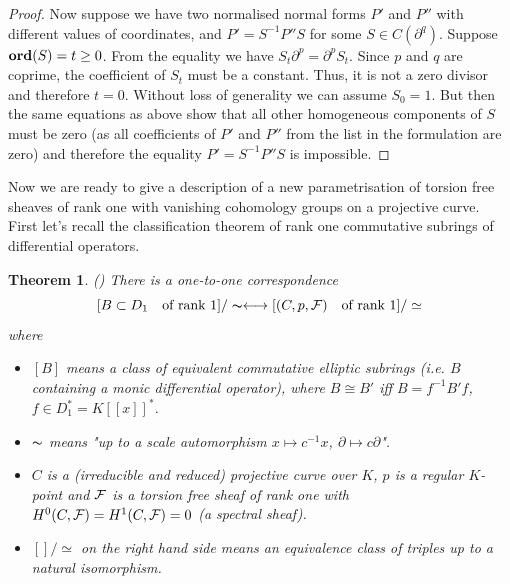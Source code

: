 \documentclass[11pt]{article}
\theoremstyle{definition}
\newcommand{\Ord}{\mathop {\rm \bf ord}}
\theoremstyle{plain}
\newtheorem{theorem}{Theorem}[section]
\numberwithin{equation}{section}
\newcommand{\cf}{{{\cal F}}}
\begin{document}
\begin{proof}
Now suppose we have two normalised normal forms $P'$ and $P''$ with different values of coordinates, and 
$P'=S^{-1}P''S$ for some $S\in C(\partial^q)$. Suppose $\Ord (S)=t\ge 0$. From the equality we have $S_t\partial^p=\partial^pS_t$. Since $p$ and $q$ are coprime, the coefficient of $S_t$ must be a constant. Thus, it is not a zero divisor and therefore $t=0$. Without loss of generality we can assume  $S_0=1$. But then the same equations as above show that all other homogeneous components of $S$ must be zero (as all coefficients of  $P'$ and $P''$ from the list in the formulation are zero) and therefore the equality $P'=S^{-1}P''S$ is impossible. 
\end{proof}


Now we are ready to give a description of a new parametrisation of torsion free sheaves of rank one with vanishing cohomology groups on a projective  curve. First let's recall the classification theorem of rank one commutative subrings of differential operators. 

\begin{theorem}{(\cite[Th. 10.26]{Zheglov_book})}
\label{T:classif2}
There is a one-to-one correspondence 
$$
[B\subset {D_1}\mbox{\quad of rank $1$}]/\thicksim  \longleftrightarrow  [(C,p,\cf  )\mbox{\quad of rank $1$}]/\simeq 
$$
where 
\begin{itemize}
\item
$[B]$ means a class of equivalent commutative elliptic subrings (i.e. $B$ containing a monic differential operator),  where   $B\cong B'$ iff $B=f^{-1}B'f$, $f\in D_1^*=K[[x]]^*$. 
\item
$\thicksim$ means "up to a scale automorphism $x\mapsto c^{-1}x$, $\partial\mapsto c\partial$".
\item $C$ is a (irreducible and reduced) projective curve over $K$, $p$ is a regular $K$-point and $\cf$ is a torsion free sheaf of rank one with $H^0(C, \cf)=H^1(C,\cf )=0$ (a spectral sheaf). 
\item  $[]/\simeq$ on the right hand side means an equivalence class of triples up to a natural isomorphism.
\end{itemize}
\end{theorem}
\end{document}
